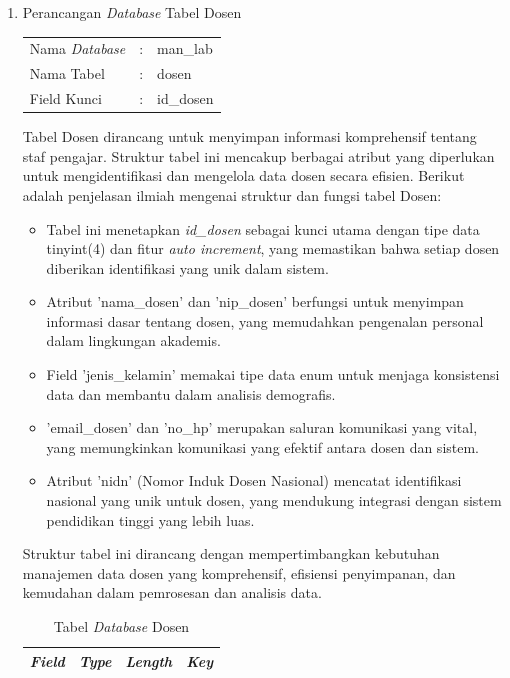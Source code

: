 \begin{enumerate}

	\item Perancangan \textit{Database} Tabel Dosen \\
	      \begin{tabular}{lll}
		      Nama \textit{Database} & : & man\_lab  \\
		      Nama Tabel             & : & dosen     \\
		      Field Kunci            & : & id\_dosen \\
	      \end{tabular}

	      Tabel Dosen dirancang untuk menyimpan informasi komprehensif tentang staf pengajar. Struktur tabel ini mencakup berbagai atribut yang diperlukan untuk mengidentifikasi dan mengelola data dosen secara efisien. Berikut adalah penjelasan ilmiah mengenai struktur dan fungsi tabel Dosen:

	      \begin{itemize}
		      \item Tabel ini menetapkan \textit{id\_dosen} sebagai kunci utama dengan tipe data tinyint(4) dan fitur \textit{auto increment}, yang memastikan bahwa setiap dosen diberikan identifikasi yang unik dalam sistem.
		      \item Atribut 'nama\_dosen' dan 'nip\_dosen' berfungsi untuk menyimpan informasi dasar tentang dosen, yang memudahkan pengenalan personal dalam lingkungan akademis.
		      \item Field 'jenis\_kelamin' memakai tipe data enum untuk menjaga konsistensi data dan membantu dalam analisis demografis.
		      \item 'email\_dosen' dan 'no\_hp' merupakan saluran komunikasi yang vital, yang memungkinkan komunikasi yang efektif antara dosen dan sistem.
		      \item Atribut 'nidn' (Nomor Induk Dosen Nasional) mencatat identifikasi nasional yang unik untuk dosen, yang mendukung integrasi dengan sistem pendidikan tinggi yang lebih luas.
	      \end{itemize}

	      Struktur tabel ini dirancang dengan mempertimbangkan kebutuhan manajemen data dosen yang komprehensif, efisiensi penyimpanan, dan kemudahan dalam pemrosesan dan analisis data.

		      {
			      \fontsize{10}{12}\selectfont
			      \begin{longtable}{l l l l}
				      \caption{Tabel \textit{\textit{Database}} Dosen}
				      \label{admin}                                                                                                  \\
				      \hline
				      \textbf{\textit{Field}} & \textbf{\textit{Type}} & \textbf{\textit{Length}}   & \textbf{\textit{Key}}          \\
				      \hline
				      \endfirsthead


\end{longtable}}
\end{enumerate}
